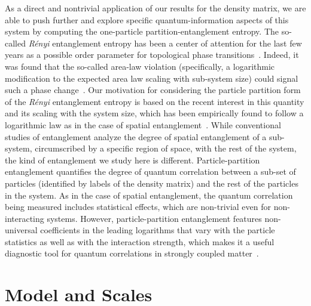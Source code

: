 \documentclass[pra,aps,groupedaddress,floatfix,twocolumn,superscriptaddress,showpacs,nofootinbib]{revtex4-1}
\begin{document}
{{
As a direct and nontrivial application of our results for the density matrix,
we are able to push further and explore specific quantum-information aspects of this system by
computing the one-particle partition-entanglement entropy.
The so-called {\it R\'enyi} entanglement entropy has been a center of attention for the last few years as a possible order parameter for topological phase
transitions~\cite{Amico:2007ag,*RevModPhys.81.865}.
Indeed, it was found that the so-called area-law violation (specifically, a logarithmic modification to the expected
area law scaling with sub-system size) could signal such a phase change~\cite{AreaLaws}.
Our motivation for considering the particle partition form of the {\it R\'enyi} entanglement
entropy is based on the recent interest in this quantity
and its scaling with the system size, which has been empirically found to follow a logarithmic law as in the case of spatial
entanglement~\cite{1751-8121-42-50-504012,*PhysRevB.76.125310,*PhysRevLett.98.060401, PhysRevA.78.042326, 2017arXiv170310587B}.
While conventional studies of entanglement analyze the degree of spatial entanglement of a
sub-system, circumscribed by a specific region of space, with the rest of the system, the kind of
entanglement we study here is different. Particle-partition entanglement quantifies the degree of quantum
correlation between a sub-set of particles (identified by labels of the density matrix) and the rest of the particles
in the system. As in the case of spatial entanglement, the quantum correlation being measured includes statistical effects,
which are non-trivial even for non-interacting systems. However, particle-partition entanglement features
non-universal coefficients in the leading logarithms that vary with the particle statistics as well as with
the interaction strength, which makes it a useful diagnostic tool for quantum correlations in strongly coupled
matter~\cite{PhysRevA.78.042326, 2017arXiv170310587B}.
}

\section{Model and Scales}\label{sec:model}

}
\end{document}
